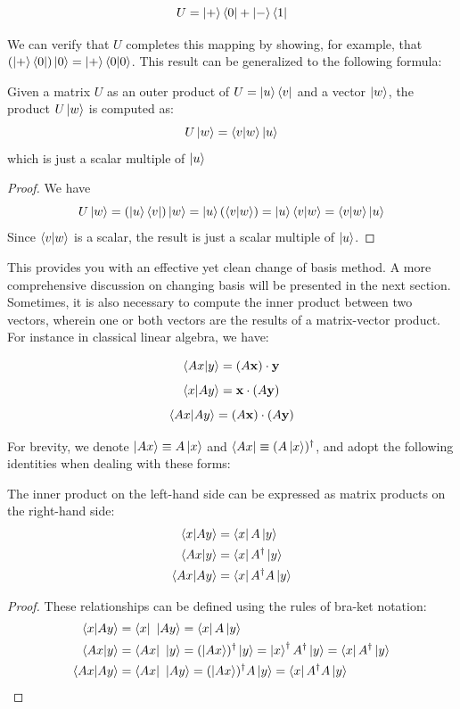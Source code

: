 \documentclass[12pt]{article}
\begin{document}
$$
U = \ket{+} \bra{0} + \ket{-} \bra{1}
$$

We can verify that $U$ completes this mapping by showing, for example, that $(\ket{+} \bra{0})\ket{0} = \ket{+} \braket{0}{0}$. This result can be generalized to the following formula:

\begin{theorem}
    Given a matrix $U$ as an outer product of $U = \ket{u} \bra{v}$ and a vector $\ket{w}$, the product $U \ket{w}$ is computed as:
    $$U \ket{w} = \braket{v}{w} \ket{u}$$
    which is just a scalar multiple of $\ket{u}$
\end{theorem}

\begin{proof}
    We have 
    $$U \ket{w} = (\ket{u} \bra{v}) \ket{w} = \ket{u} (\bra{v} \ket{w}) = \ket{u} \braket{v}{w} = \braket{v}{w} \ket{u}$$
    Since $\braket{v}{w}$ is a scalar, the result is just a scalar multiple of $\ket{u}$. 
\end{proof}

This provides you with an effective yet clean change of basis method. A more comprehensive discussion on changing basis will be presented in the next section. Sometimes, it is also necessary to compute the inner product between two vectors, wherein one or both vectors are the results of a matrix-vector product. For instance in classical linear algebra, we have:

$$\braket{Ax}{y} = (A\mathbf{x}) \cdot \mathbf{y}$$
$$\braket{x}{Ay} = \mathbf{x} \cdot (A\mathbf{y})$$
$$\braket{Ax}{Ay} = (A\mathbf{x}) \cdot (A\mathbf{y})$$

For brevity, we denote $\ket{Ax} \equiv A \ket{x}$ and $\bra{Ax} \equiv (A \ket{x})^\dagger$, and adopt the following identities when dealing with these forms:

\begin{theorem}
    The inner product on the left-hand side can be expressed as matrix products on the right-hand side:
    \begin{align*}
        \braket{x}{Ay} &= \bra{x} A \ket{y} \\
        \braket{Ax}{y} &= \bra{x} A^\dagger \ket{y} \\
        \braket{Ax}{Ay} &= \bra{x} A^\dagger A \ket{y}\\
    \end{align*}
\end{theorem}

\begin{proof}
    These relationships can be defined using the rules of bra-ket notation:
    \begin{align*}
        \braket{x}{Ay} &= \bra{x}\ \ket{Ay} = \bra{x} A \ket{y} \\
        \braket{Ax}{y} &= \bra{Ax}\ \ket{y} = (\ket{Ax})^\dagger \ket{y} = \ket{x}^\dagger A^\dagger \ket{y} = \bra{x} A^\dagger \ket{y} \\
        \braket{Ax}{Ay} &= \bra{Ax}\ \ket{Ay} = (\ket{Ax})^\dagger A \ket{y} = \bra{x} A^\dagger A \ket{y} \\
    \end{align*}
\end{proof}
\end{document}
